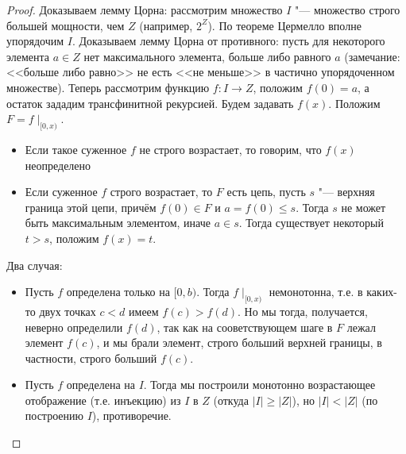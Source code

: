\begin{proof}
	Доказываем лемму Цорна: рассмотрим множество $I$ "--- множество строго большей мощности, чем $Z$
	(например, $2^Z$).
	По теореме Цермелло вполне упорядочим $I$.
	Доказываем лемму Цорна от противного: пусть для некоторого элемента $a \in Z$ нет максимального элемента,
	больше либо равного $a$ (замечание: <<больше либо равно>> не есть <<не меньше>> в частично упорядоченном множестве).
	Теперь рассмотрим функцию $f \colon I \to Z$, положим $f(0)=a$, а остаток зададим трансфинитной рекурсией.
	Будем задавать $f(x)$.
	Положим $F=f\mid_{[0, x)}$.
	\begin{itemize}
		\item
			Если такое суженное $f$ не строго возрастает, то говорим, что $f(x)$ неопределено
		\item
			Если суженное $f$ строго возрастает, то $F$ есть цепь, пусть $s$ "--- верхняя граница этой цепи,
			причём $f(0) \in F$ и $a = f(0) \le s$.
			Тогда $s$ не может быть максимальным элементом, иначе $a \in s$.
			Тогда существует некоторый $t>s$, положим $f(x)=t$.
	\end{itemize}

	Два случая:
	\begin{itemize}
		\item
			Пусть $f$ определена только на $[0, b)$.
			Тогда $f\mid_{[0, x)}$ немонотонна, т.е. в каких-то двух точках $c < d$ имеем
			$f(c) > f(d)$.
			Но мы тогда, получается, неверно определили $f(d)$, так как на сооветствующем
			шаге в $F$ лежал элемент $f(c)$, и мы брали элемент, строго больший верхней границы,
			в частности, строго больший $f(c)$.
		\item
			Пусть $f$ определена на $I$.
			Тогда мы построили монотонно возрастающее отображение (т.е. инъекцию)
			из $I$ в $Z$ (откуда $|I| \ge |Z|$), но $|I| < |Z|$ (по построению $I$), противоречие.
	\end{itemize}
\end{proof}

